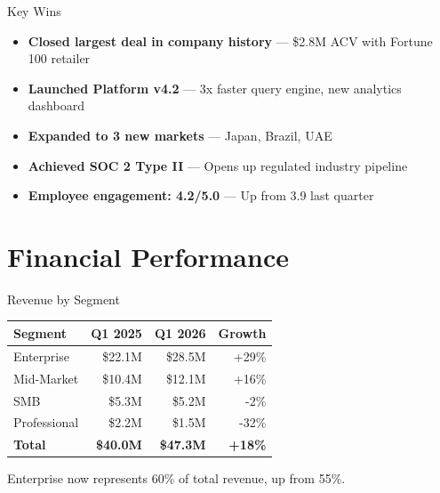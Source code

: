 \documentclass[aspectratio=169,11pt]{beamer}
\begin{document}
\begin{frame}{Key Wins}
    \begin{itemize}
        \item<1-> \textbf{Closed largest deal in company history} --- \$2.8M ACV with Fortune 100 retailer
        \item<2-> \textbf{Launched Platform v4.2} --- 3x faster query engine, new analytics dashboard
        \item<3-> \textbf{Expanded to 3 new markets} --- Japan, Brazil, UAE
        \item<4-> \textbf{Achieved SOC 2 Type II} --- Opens up regulated industry pipeline
        \item<5-> \textbf{Employee engagement: 4.2/5.0} --- Up from 3.9 last quarter
    \end{itemize}
\end{frame}

\section{Financial Performance}

\begin{frame}{Revenue by Segment}
    \centering
    \begin{tabular}{l r r r}
        \toprule
        \textbf{Segment} & \textbf{Q1 2025} & \textbf{Q1 2026} & \textbf{Growth} \\
        \midrule
        Enterprise   & \$22.1M & \$28.5M & {\color{success} +29\%} \\
        Mid-Market   & \$10.4M & \$12.1M & {\color{success} +16\%} \\
        SMB          & \$5.3M  & \$5.2M  & {\color{warning} -2\%} \\
        Professional & \$2.2M  & \$1.5M  & {\color{red} -32\%} \\
        \midrule
        \textbf{Total} & \textbf{\$40.0M} & \textbf{\$47.3M} & {\color{success} \textbf{+18\%}} \\
        \bottomrule
    \end{tabular}

    \vspace{12pt}
    \small Enterprise now represents 60\% of total revenue, up from 55\%.
\end{frame}
\end{document}
